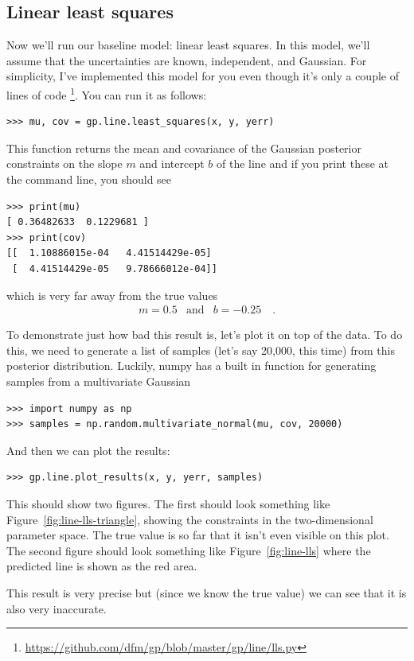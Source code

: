 \documentclass[12pt,preprint]{aastex}
\newcommand{\project}[1]{{\sffamily #1}}
\newcommand{\Fig}[1]{Figure~\ref{fig:#1}}
\newcommand{\fig}[1]{\Fig{#1}}
\begin{document}
\subsection{Linear least squares}

Now we'll run our baseline model: linear least squares.
In this model, we'll assume that the uncertainties are known, independent, and
Gaussian.
For simplicity, I've implemented this model for you even though it's only a
couple of lines of code%
\footnote{\url{https://github.com/dfm/gp/blob/master/gp/line/lls.py}}.
You can run it as follows:
\begin{lstlisting}
>>> mu, cov = gp.line.least_squares(x, y, yerr)
\end{lstlisting}
This function returns the mean and covariance of the Gaussian posterior
constraints on the slope $m$ and intercept $b$ of the line and if you print
these at the command line, you should see
\begin{lstlisting}
>>> print(mu)
[ 0.36482633  0.1229681 ]
>>> print(cov)
[[  1.10886015e-04   4.41514429e-05]
 [  4.41514429e-05   9.78666012e-04]]
\end{lstlisting}
which is very far away from the true values
\begin{eqnarray}
m = 0.5 &\mathrm{and}& b = -0.25 \quad.
\end{eqnarray}

To demonstrate just how bad this result is, let's plot it on top of the data.
To do this, we need to generate a list of samples (let's say 20,000, this
time) from this posterior distribution.
Luckily, \project{numpy} has a built in function for generating samples from a
multivariate Gaussian
\begin{lstlisting}
>>> import numpy as np
>>> samples = np.random.multivariate_normal(mu, cov, 20000)
\end{lstlisting}
And then we can plot the results:
\begin{lstlisting}
>>> gp.line.plot_results(x, y, yerr, samples)
\end{lstlisting}
This should show two figures.
The first should look something like \fig{line-lls-triangle}, showing the
constraints in the two-dimensional parameter space.
The true value is so far that it isn't even visible on this plot.
The second figure should look something like \fig{line-lls} where the
predicted line is shown as the red area.

This result is very precise but (since we know the true value) we can see that
it is also very inaccurate.
\end{document}
